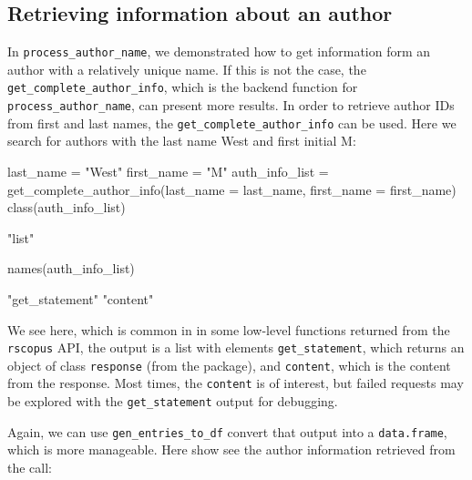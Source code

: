 \hypertarget{retrieving-information-about-an-author}{%
\subsection{Retrieving information about an
author}\label{retrieving-information-about-an-author}}

In \texttt{process\_author\_name}, we demonstrated how to get
information form an author with a relatively unique name. If this is not
the case, the \texttt{get\_complete\_author\_info}, which is the backend
function for \texttt{process\_author\_name}, can present more results.
In order to retrieve author IDs from first and last names, the
\texttt{get\_complete\_author\_info} can be used. Here we search for
authors with the last name West and first initial M:

\begin{Schunk}
\begin{Sinput}
last_name = "West"
first_name = "M"
auth_info_list = get_complete_author_info(last_name = last_name, first_name = first_name)
class(auth_info_list)
\end{Sinput}
\begin{Soutput}
[1] "list"
\end{Soutput}
\begin{Sinput}
names(auth_info_list)
\end{Sinput}
\begin{Soutput}
[1] "get_statement" "content"      
\end{Soutput}
\end{Schunk}

We see here, which is common in in some low-level functions returned
from the \texttt{rscopus} API, the output is a list with elements
\texttt{get\_statement}, which returns an object of class
\texttt{response} (from the  package), and \texttt{content},
which is the content from the response. Most times, the \texttt{content}
is of interest, but failed requests may be explored with the
\texttt{get\_statement} output for debugging.

Again, we can use \texttt{gen\_entries\_to\_df} convert that output into
a \texttt{data.frame}, which is more manageable. Here show see the
author information retrieved from the call:

